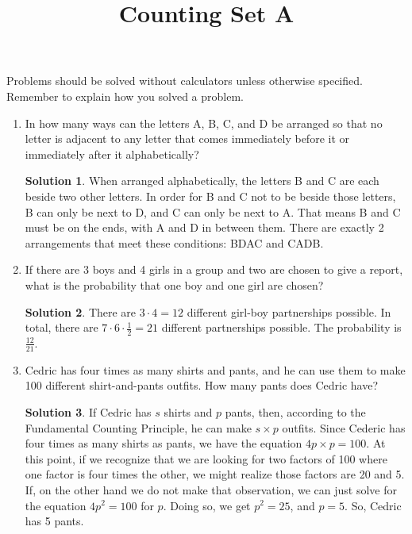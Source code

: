 \documentclass{article}
\title{Counting Set A}
\author{}
\date{}
\theoremstyle{definition}
\newtheorem*{solution}{Solution}
\begin{document}
    \maketitle
    \noindent Problems should be solved without calculators unless otherwise specified.
    Remember to explain how you solved a problem.
    \begin{enumerate}
        \item In how many ways can the letters A, B, C, and D be arranged so that no letter is
        adjacent to any letter that comes immediately before it or immediately after it alphabetically?
        \begin{solution}
            When arranged alphabetically, the letters B and C are each beside two other letters.
            In order for B and C not to be beside those letters, B can only be next to D,
            and C can only be next to A. That means B and C must be on the ends, with A and D
            in between them. There are exactly 2 arrangements that meet these conditions:
            BDAC and CADB.
        \end{solution}
        \item If there are 3 boys and 4 girls in a group and two are chosen to give a report,
        what is the probability that one boy and one girl are chosen?
        \begin{solution}
            There are $3 \cdot 4 = 12$ different girl-boy partnerships possible. In total,
            there are $7 \cdot 6 \cdot \frac{1}{2} = 21$ different partnerships possible.
            The probability is $\frac{12}{21}$.
        \end{solution}
        \item Cedric has four times as many shirts and pants, and he can use them to make
        100 different shirt-and-pants outfits. How many pants does Cedric have?
        \begin{solution}
            If Cedric has $s$ shirts and $p$ pants, then, according to the Fundamental Counting
            Principle, he can make $s \times p$ outfits. Since Cederic has four times as many
            shirts as pants, we have the equation $4p \times p = 100$. At this point, if we
            recognize that we are looking for two factors of 100 where one factor is four times
            the other, we might realize those factors are 20 and 5. If, on the other hand we
            do not make that observation, we can just solve for the equation $4p^2 = 100$ for $p$.
            Doing so, we get $p^2 = 25$, and $p = 5$. So, Cedric has 5 pants.

\end{solution}
\end{enumerate}
\end{document}
